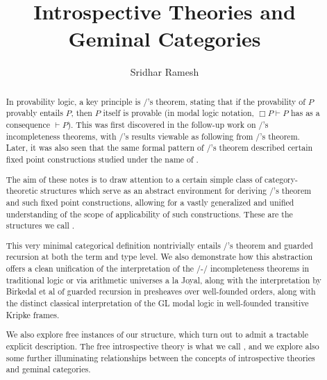 \documentclass{ucbthesis}
\title{Introspective Theories and Geminal Categories}
\author{Sridhar Ramesh}
\begin{document}
\maketitle

\copyrightpage

\begin{abstract}
In provability logic, a key principle is \Loeb/'s theorem, stating that if the provability of $P$ provably entails $P$, then $P$ itself is provable (in modal logic notation, $\Box P \vdash P$ has as a consequence $\vdash P$). This was first discovered in the follow-up work on \Goedel/'s incompleteness theorems, with \Goedel/'s results viewable as following from \Loeb/'s theorem. Later, it was also seen that the same formal pattern of \Loeb/'s theorem described certain fixed point constructions studied under the name of .

The aim of these notes is to draw attention to a certain simple class of category-theoretic structures which serve as an abstract environment for deriving \Loeb/'s theorem and such fixed point constructions, allowing for a vastly generalized and unified understanding of the scope of applicability of such constructions. These are the structures we call .

This very minimal categorical definition nontrivially entails \Loeb/'s theorem and guarded recursion at both the term and type level. We also demonstrate how this abstraction offers a clean unification of the interpretation of the \Godel/-\Lob/ incompleteness theorems in traditional logic or via arithmetic universes a la Joyal, along with the interpretation by Birkedal et al of guarded recursion in presheaves over well-founded orders, along with the distinct classical interpretation of the GL modal logic in well-founded transitive Kripke frames.

We also explore free instances of our structure, which turn out to admit a tractable explicit description. The free introspective theory is what we call , and we explore also some further illuminating relationships between the concepts of introspective theories and geminal categories.

\end{abstract}
\end{document}
